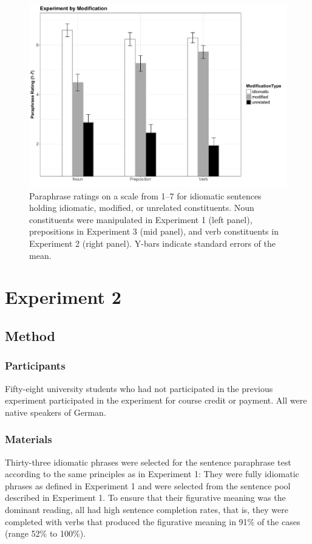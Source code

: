 \begin{figure}[hbt!]
  \includegraphics[width=\linewidth]{figures/smolka.pdf}
  \caption{Paraphrase ratings on a scale from 1--7 for idiomatic sentences holding idiomatic, modified, or unrelated constituents. Noun constituents were manipulated in Experiment 1 (left panel), prepositions in Experiment 3 (mid panel), and verb constituents in Experiment 2 (right panel). Y-bars indicate standard errors of the mean.}
  \label{fig:chart}
\end{figure}



\section{Experiment 2}

\subsection{Method}

\subsubsection{Participants}
Fifty-eight university students who had not participated in the previous experiment participated in the experiment for course credit or payment. All were native speakers of German. 

\subsubsection{Materials}
Thirty-three idiomatic phrases were selected for the sentence paraphrase test according to the same principles as in Experiment 1: They were fully idiomatic phrases as defined in Experiment 1 and were selected from the sentence pool described in Experiment 1. To ensure that their figurative meaning was the dominant reading, all had high sentence completion rates, that is, they were completed with verbs that produced the figurative meaning in 91\% of the cases (range 52\% to 100\%).

